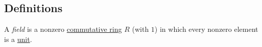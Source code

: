 \subsection{Definitions}\label{fielddefinition}

A \emph{field} is a nonzero \hyperref[commutativeringdefinition]{commutative ring} $R$ (with $1$) in which every
nonzero element is a \hyperref[units]{unit}.